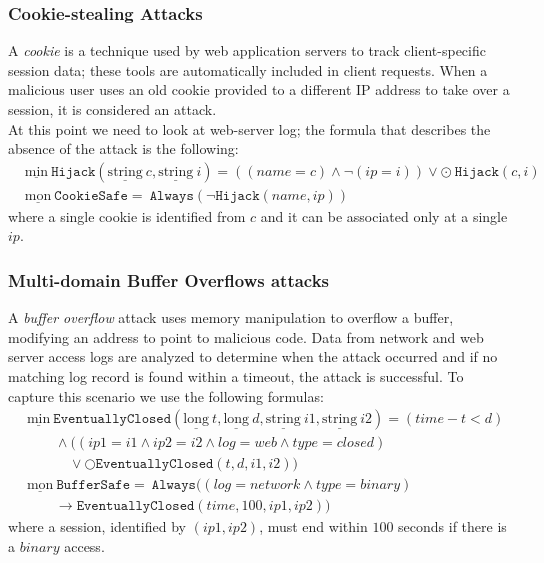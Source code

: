 \documentclass[aspectratio=169,t,xcolor=table]{beamer}
\begin{document}
\begin{frame}
    \frametitle{Cookie-stealing Attacks}
    A \textit{cookie} is a technique used by web application servers to track client-specific session data; these tools are automatically included in client requests. When a malicious user uses an old cookie provided to a different IP address to take over a session, it is considered an attack.\\ \vspace{2.5mm} At this point we need to look at web-server log; the formula that describes the absence of the attack is the following:
    \begin{align*}
        & \underline{\text{min}}\ \mathtt{Hijack}(\underline{\text{string}}\ c,\underline{\text{string}}\ i) = ((name=c)\land\neg(ip=i))\lor\odot\ \mathtt{Hijack}(c,i) \\
        & \underline{\text{mon}}\ \mathtt{CookieSafe} =\ \mathtt{Always}(\neg\mathtt{Hijack}(name,ip)) 
    \end{align*}
    where a single cookie is identified from $c$ and it can be associated only at a single $ip$.
\end{frame}

\begin{frame}
    \frametitle{Multi-domain Buffer Overflows attacks}
    A \textit{buffer overflow} attack uses memory manipulation to overflow a buffer, modifying an address to point to malicious code. Data from network and web server access logs are analyzed to determine when the attack occurred and if no matching log record is found within a timeout, the attack is successful. To capture this scenario we use the following formulas:
    \begin{align*}
        & \underline{\text{min}}\ \mathtt{EventuallyClosed}(\underline{\text{long}}\ t,\underline{\text{long}}\ d,\underline{\text{string}}\ i1,\underline{\text{string}}\ i2) = (time-t<d)\\
        & \quad\quad\land ((ip1=i1\land ip2=i2\land log=web\land type=closed)\\
        & \quad\quad\quad\lor \bigcirc\mathtt{EventuallyClosed}(t,d,i1,i2) ) \\
        & \underline{\text{mon}}\ \mathtt{BufferSafe} =\ \mathtt{Always}((log=network\land type=binary) \\
        & \quad\quad\rightarrow\mathtt{EventuallyClosed}(time,100,ip1,ip2))
    \end{align*}
    where a session, identified by $(ip1,ip2)$, must end within $100$ seconds if there is a $binary$ access.
\end{frame}
\end{document}
